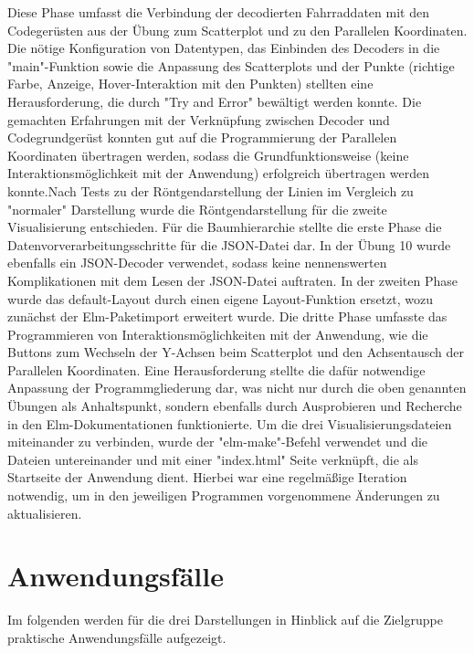 \documentclass[usegeometry=true]{scrartcl}
\begin{document}
Diese Phase umfasst die Verbindung der decodierten Fahrraddaten mit den Codegerüsten aus der Übung zum Scatterplot und zu den Parallelen Koordinaten. Die nötige Konfiguration von Datentypen, das Einbinden des Decoders in die "main"-Funktion sowie die Anpassung des Scatterplots und der Punkte (richtige Farbe, Anzeige, Hover-Interaktion mit den Punkten) stellten eine Herausforderung, die durch "Try and Error" bewältigt werden konnte. Die gemachten Erfahrungen mit der Verknüpfung zwischen Decoder und Codegrundgerüst konnten gut auf die Programmierung der Parallelen Koordinaten übertragen werden, sodass die Grundfunktionsweise (keine Interaktionsmöglichkeit mit der Anwendung) erfolgreich übertragen werden konnte.Nach Tests zu der Röntgendarstellung der Linien im Vergleich zu "normaler" Darstellung wurde die Röntgendarstellung für die zweite Visualisierung entschieden.
Für die Baumhierarchie stellte die erste Phase die Datenvorverarbeitungsschritte für die JSON-Datei dar. In der Übung 10 wurde ebenfalls ein JSON-Decoder verwendet, sodass keine nennenswerten Komplikationen mit dem Lesen der JSON-Datei auftraten. In der zweiten Phase wurde das default-Layout durch einen eigene Layout-Funktion ersetzt, wozu zunächst der Elm-Paketimport erweitert wurde.
Die dritte Phase umfasste das Programmieren von Interaktionsmöglichkeiten mit der Anwendung, wie die Buttons zum Wechseln der Y-Achsen beim Scatterplot und den Achsentausch der Parallelen Koordinaten. Eine Herausforderung stellte die dafür notwendige Anpassung der Programmgliederung dar, was nicht nur durch die oben genannten Übungen als Anhaltspunkt, sondern ebenfalls durch Ausprobieren und Recherche in den Elm-Dokumentationen funktionierte. 
Um die drei Visualisierungsdateien miteinander zu verbinden, wurde der "elm-make"-Befehl verwendet und die Dateien untereinander und mit einer "index.html" Seite verknüpft, die als Startseite der Anwendung dient. Hierbei war eine regelmäßige Iteration notwendig, um in den jeweiligen Programmen vorgenommene Änderungen zu aktualisieren. 
 
\section{Anwendungsfälle}
Im folgenden werden für die drei Darstellungen in Hinblick auf die Zielgruppe praktische Anwendungsfälle aufgezeigt. 
\end{document}
